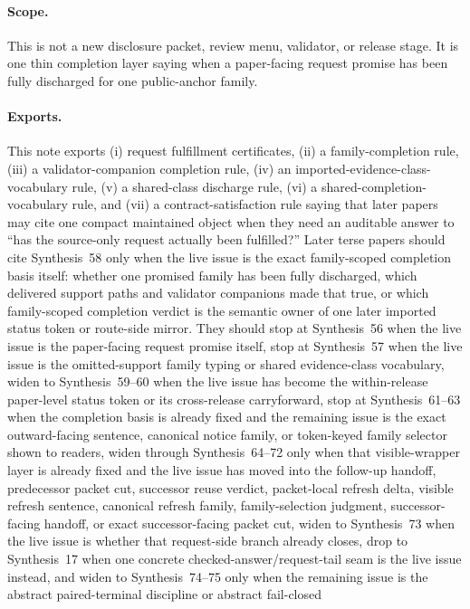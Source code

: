 \documentclass[11pt]{article}
\begin{document}
\paragraph{Scope.}
This is not a new disclosure packet, review menu, validator, or release stage.
It is one thin completion layer saying when a paper-facing request promise has been fully discharged for one public-anchor family.

\paragraph{Exports.}
This note exports (i) request fulfillment certificates, (ii) a family-completion rule, (iii) a validator-companion completion rule, (iv) an imported-evidence-class-vocabulary rule, (v) a shared-class discharge rule, (vi) a shared-completion-vocabulary rule, and (vii) a contract-satisfaction rule saying that later papers may cite one compact maintained object when they need an auditable answer to ``has the source-only request actually been fulfilled?'' Later terse papers should cite Synthesis~58 only when the live issue is the exact family-scoped completion basis itself: whether one promised family has been fully discharged, which delivered support paths and validator companions made that true, or which family-scoped completion verdict is the semantic owner of one later imported status token or route-side mirror. They should stop at Synthesis~56 when the live issue is the paper-facing request promise itself, stop at Synthesis~57 when the live issue is the omitted-support family typing or shared evidence-class vocabulary, widen to Synthesis~59--60 when the live issue has become the within-release paper-level status token or its cross-release carryforward, stop at Synthesis~61--63 when the completion basis is already fixed and the remaining issue is the exact outward-facing sentence, canonical notice family, or token-keyed family selector shown to readers, widen through Synthesis~64--72 only when that visible-wrapper layer is already fixed and the live issue has moved into the follow-up handoff, predecessor packet cut, successor reuse verdict, packet-local refresh delta, visible refresh sentence, canonical refresh family, family-selection judgment, successor-facing handoff, or exact successor-facing packet cut, widen to Synthesis~73 when the live issue is whether that request-side branch already closes, drop to Synthesis~17 when one concrete checked-answer/request-tail seam is the live issue instead, and widen to Synthesis~74--75 only when the remaining issue is the abstract paired-terminal discipline or abstract fail-closed 
\end{document}
